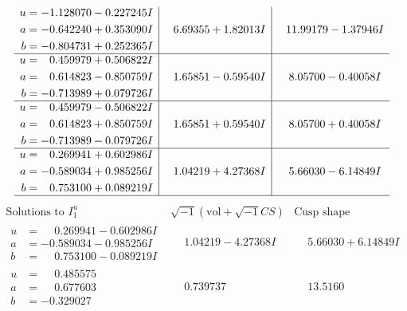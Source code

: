 \documentclass[1p]{elsarticle_modified}
\theoremstyle{definition}
\newcommand{\I}{\sqrt{-1}}
\begin{document}
$$\begin{array}{c|c|c}
\begin{aligned}
u &= -1.128070 - 0.227245 I \\
a &= -0.642240 + 0.353090 I \\
b &= -0.804731 + 0.252365 I\end{aligned}
 & \phantom{-}6.69355 + 1.82013 I & \phantom{-}11.99179 - 1.37946 I \\ \hline\begin{aligned}
u &= \phantom{-}0.459979 + 0.506822 I \\
a &= \phantom{-}0.614823 - 0.850759 I \\
b &= -0.713989 + 0.079726 I\end{aligned}
 & \phantom{-}1.65851 - 0.59540 I & \phantom{-}8.05700 - 0.40058 I \\ \hline\begin{aligned}
u &= \phantom{-}0.459979 - 0.506822 I \\
a &= \phantom{-}0.614823 + 0.850759 I \\
b &= -0.713989 - 0.079726 I\end{aligned}
 & \phantom{-}1.65851 + 0.59540 I & \phantom{-}8.05700 + 0.40058 I \\ \hline\begin{aligned}
u &= \phantom{-}0.269941 + 0.602986 I \\
a &= -0.589034 + 0.985256 I \\
b &= \phantom{-}0.753100 + 0.089219 I\end{aligned}
 & \phantom{-}1.04219 + 4.27368 I & \phantom{-}5.66030 - 6.14849 I\\
 \hline 
 \end{array}$$\newpage$$\begin{array}{c|c|c}  
\text{Solutions to }I^u_{1}& \I (\text{vol} + \sqrt{-1}CS) & \text{Cusp shape}\\
 \hline 
\begin{aligned}
u &= \phantom{-}0.269941 - 0.602986 I \\
a &= -0.589034 - 0.985256 I \\
b &= \phantom{-}0.753100 - 0.089219 I\end{aligned}
 & \phantom{-}1.04219 - 4.27368 I & \phantom{-}5.66030 + 6.14849 I \\ \hline\begin{aligned}
u &= \phantom{-}0.485575\phantom{ +0.000000I} \\
a &= \phantom{-}0.677603\phantom{ +0.000000I} \\
b &= -0.329027\phantom{ +0.000000I}\end{aligned}
 & \phantom{-}0.739737\phantom{ +0.000000I} & \phantom{-}13.5160\phantom{ +0.000000I} \\ \hline\begin{aligned}

\end{aligned}
\end{array}$$
\end{document}
